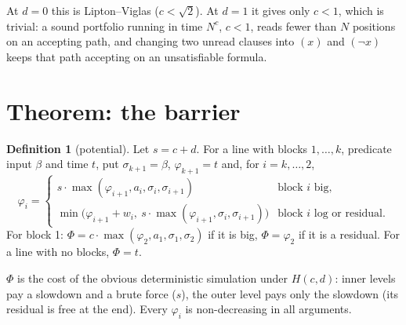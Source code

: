 \documentclass[11pt]{article}
\theoremstyle{definition}
\newtheorem{definition}[theorem]{Definition}
\theoremstyle{remark}
\begin{document}
\noindent At $d=0$ this is Lipton--Viglas ($c<\sqrt2$). At $d=1$ it gives only $c<1$, which is trivial: a
sound portfolio running in time $N^{c}$, $c<1$, reads fewer than $N$ positions on an accepting path, and
changing two unread clauses into $(x)$ and $(\neg x)$ keeps that path accepting on an unsatisfiable formula.

\section{Theorem: the barrier}\label{sec:barrier}

\begin{definition}[potential]
Let $s=c+d$. For a line with blocks $1,\dots,k$, predicate input $\beta$ and time $t$, put
$\sigma_{k+1}=\beta$, $\varphi_{k+1}=t$ and, for $i=k,\dots,2$,
\[
\varphi_i=\begin{cases}
s\cdot\max(\varphi_{i+1},a_i,\sigma_i,\sigma_{i+1}) & \text{block $i$ big},\\
\min\bigl(\varphi_{i+1}+w_i,\ s\cdot\max(\varphi_{i+1},\sigma_i,\sigma_{i+1})\bigr) & \text{block $i$ log or residual}.
\end{cases}
\]
For block 1: $\Phi=c\cdot\max(\varphi_2,a_1,\sigma_1,\sigma_2)$ if it is big, $\Phi=\varphi_2$ if it is a residual.
For a line with no blocks, $\Phi=t$.
\end{definition}

\noindent $\Phi$ is the cost of the obvious deterministic simulation under $H(c,d)$: inner levels pay a
slowdown and a brute force ($s$), the outer level pays only the slowdown (its residual is free at the end).
Every $\varphi_i$ is non-decreasing in all arguments.
\end{document}
